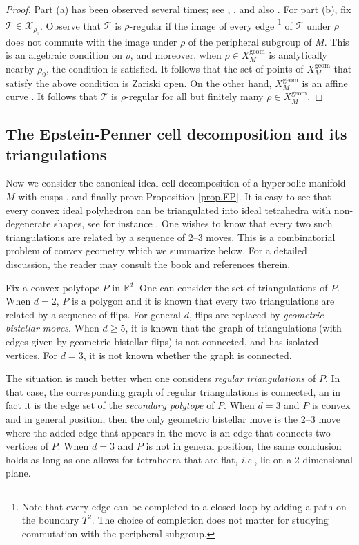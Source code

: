\documentclass[12pt]{amsart}
\newcommand{\lbl}{\label}
\theoremstyle{definition}
\def\BR{\mathbb R}
\def\calT{\mathcal T}
\def\calX{\mathcal X}
\def\geom{\mathrm{geom}}
\newcommand{\ie}{\emph{i.e.}}
\numberwithin{equation}{section}
\begin{document}
\begin{proof}
Part (a) has been observed several times; see \cite{Champanerkar},
\cite[Sec.10.3]{BDR-V}, \cite[Thm.2.3]{Till} and also \cite[Rem.3.4]{DnG}.
For part (b), fix $\calT \in \calX_{\rho_0}$. Observe that $\calT$ is
$\rho$-regular if the image of 
every edge%
%
\footnote{Note that every edge can be completed to a closed loop by adding a 
path on the boundary $T^2$. The choice of completion does not matter for 
studying commutation with the peripheral subgroup.} %
%
of $\calT$ under $\rho$ does not commute with the image under
$\rho$ of the peripheral subgroup of $M$. This is an algebraic 
condition on $\rho$, and moreover, when $\rho \in X^{\geom}_M$ is analytically
nearby $\rho_0$, the condition is satisfied. It follows that the set
of points of $ X^{\geom}_M$ that satisfy the above condition is Zariski
open. On the other hand, $X^{\geom}_M$ is an affine curve \cite{Th,NZ}.
It follows that $\calT$ is $\rho$-regular for all but finitely many
$\rho \in  X^{\geom}_M$. 
\end{proof}


\subsection{The Epstein-Penner cell decomposition and its triangulations}
\lbl{sub.EP}

Now we consider the canonical ideal cell decomposition of
a hyperbolic manifold $M$ with cusps \cite{EP}, and finally prove Proposition \ref{prop.EP}. It is easy to
see that every convex ideal polyhedron can be triangulated into ideal
tetrahedra with non-degenerate shapes, see for instance \cite{HRS}.
One wishes to know that every two such triangulations are related by
a sequence of 2--3 moves. This is a combinatorial problem of convex geometry
which we summarize below. For a detailed discussion,  
the reader may consult the book \cite{LRS} and references therein.

Fix a convex polytope $P$ in $\BR^d$. One can consider the set of
triangulations of $P$. When $d=2$, $P$ is a polygon and it is known that 
every two triangulations are related by a sequence of flips. For general
$d$, flips are replaced by {\em geometric bistellar moves}. When $d \geq 5$,
it is known that the graph of triangulations (with edges given
by geometric bistellar flips) is not connected, and has isolated vertices.
For $d=3$, it is not known whether the graph is connected.

The situation is much better when one considers {\em regular triangulations}
of $P$. In that case, the corresponding graph of regular triangulations
is connected, an in fact it is the edge set of the 
{\em secondary polytope} of $P$. When $d=3$ and $P$ is convex and in general 
position, then the only geometric bistellar move is the 2--3 move where
the added edge that appears in the move is an edge that connects two vertices
of $P$. When $d=3$ and $P$ is not in general position, the same conclusion
holds as long as one allows for tetrahedra that are flat, \ie, lie
on a 2-dimensional plane.
\end{document}
